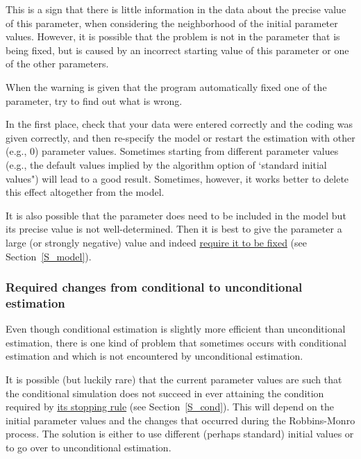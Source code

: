 \documentclass[a4paper,fleqn,11pt]{article}
\newcommand{\+}{\, + \,}
\begin{document}
This is a sign that there is little information in the data about
the precise value of this parameter, when considering the
neighborhood of the initial parameter values. However, it is
possible that the problem is not in the parameter that is being
fixed, but is caused by an incorrect starting value of this
parameter or one of the other parameters.

When the warning is given that the program automatically fixed one
of the parameter, try to find out what is wrong.

In the first place, check that your data were entered correctly
and the coding was given correctly, and then re-specify the model
or restart the estimation with other (e.g., 0) parameter values.
Sometimes starting from different parameter values (e.g., the
default values implied by the algorithm option
of `standard initial values") will lead to a good result.
Sometimes, however, it works better to delete this effect
altogether from the model.

It is also possible that the parameter does need to be included in
the model but its precise value is not well-determined. Then it is
best to give the parameter a large (or strongly negative) value
and indeed
\hyperlink{T_fix}{require it to be fixed}
(see Section~\ref{S_model}).


\subsubsection{Required changes from conditional to unconditional estimation}

Even though conditional estimation is slightly more efficient than
unconditional estimation, there is one kind of problem that
sometimes occurs with conditional estimation and which is not
encountered by unconditional estimation.

It is possible (but luckily rare) that the current parameter
values are such that the conditional
simulation does not succeed in ever attaining the condition required
by \hyperlink{T_distance_stop}{its stopping rule} (see
Section~\ref{S_cond}).
This will depend on the initial parameter values
and the changes that occurred during the Robbins-Monro process.
The solution is either to use different
(perhaps standard) initial values or to go over to
unconditional estimation.
\end{document}
